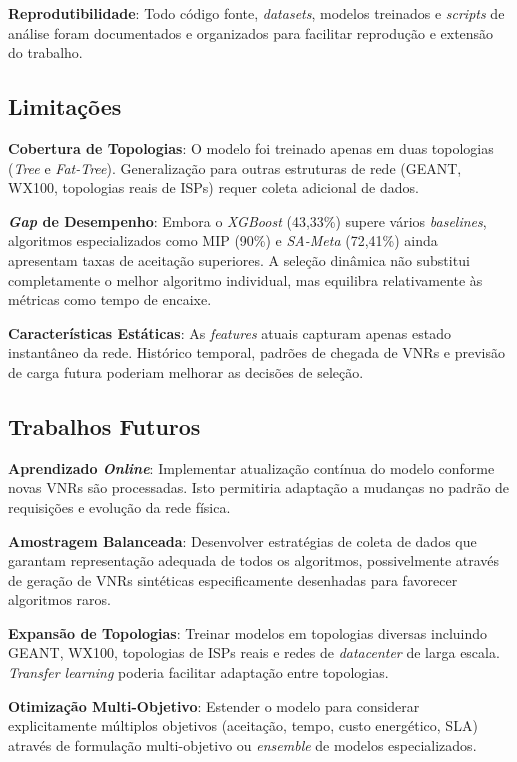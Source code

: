 \documentclass[conference]{IEEEtran}
\begin{document}
\textbf{Reprodutibilidade}: Todo código fonte, \textit{datasets}, modelos treinados e \textit{scripts} de análise foram documentados e organizados para facilitar reprodução e extensão do trabalho.

\subsection{Limitações}

\textbf{Cobertura de Topologias}: O modelo foi treinado apenas em duas topologias (\textit{Tree} e \textit{Fat-Tree}). Generalização para outras estruturas de rede (GEANT, WX100, topologias reais de ISPs) requer coleta adicional de dados.

\textbf{\textit{Gap} de Desempenho}: Embora o \textit{XGBoost} (43,33\%) supere vários \textit{baselines}, algoritmos especializados como MIP (90\%) e \textit{SA-Meta} (72,41\%) ainda apresentam taxas de aceitação superiores.
A seleção dinâmica não substitui completamente o melhor algoritmo individual, mas equilibra relativamente às métricas como tempo de encaixe.

\textbf{Características Estáticas}: As \textit{features} atuais capturam apenas estado instantâneo da rede. Histórico temporal, padrões de chegada de VNRs e previsão de carga futura poderiam melhorar as decisões de seleção.

\subsection{Trabalhos Futuros}

\textbf{Aprendizado \textit{Online}}: Implementar atualização contínua do modelo conforme novas VNRs são processadas. Isto permitiria adaptação a mudanças no padrão de requisições e evolução da rede física.

\textbf{Amostragem Balanceada}: Desenvolver estratégias de coleta de dados que garantam representação adequada de todos os algoritmos, possivelmente através de geração de VNRs sintéticas especificamente desenhadas para favorecer algoritmos raros.

\textbf{Expansão de Topologias}: Treinar modelos em topologias diversas incluindo GEANT, WX100, topologias de ISPs reais e redes de \textit{datacenter} de larga escala. \textit{Transfer learning} poderia facilitar adaptação entre topologias.

\textbf{Otimização Multi-Objetivo}: Estender o modelo para considerar explicitamente múltiplos objetivos (aceitação, tempo, custo energético, SLA) através de formulação multi-objetivo ou \textit{ensemble} de modelos especializados.
\end{document}
